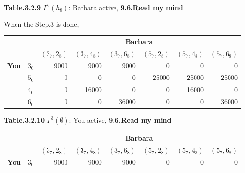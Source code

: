 \documentclass{article}
\begin{document}
\begin{description}
\begin{center}
         {\bf Table.3.2.9 }$\Gamma ^2(h_8)$: Barbara active, {\bf 9.6.Read my mind}
    \end{center}
    When the Step.3 is done,
    \begin{center}
        \begin{tabular}{rrrrrrrr}
        \hline
        \hline
                   &            &                                          \multicolumn{ 6}{c}{{\bf Barbara}} \\

                   &            &  $(3_7,2_8)$ &  $(3_7,4_8)$ &  $(3_7,6_8)$ &  $(5_7,2_8)$ &  $(5_7,4_8)$ &  $(5_7,6_8)$ \\
        \hline
        \multicolumn{ 1}{c}{{\bf You}} &        $3_0$ &       9000 &       9000 &       9000 &          0 &          0 &          0 \\

        \multicolumn{ 1}{c}{{\bf }} &        $5_0$ &          0 &          0 &          0 &      25000 &      25000 &      25000 \\

        \multicolumn{ 1}{c}{{\bf }} &        $4_0$ &          0 &      16000 &          0 &          0 &      16000 &          0 \\

        \multicolumn{ 1}{c}{{\bf }} &        $6_0$ &          0 &          0 &      36000 &          0 &          0 &      36000 \\
        \hline
        \hline
        \end{tabular}

        {\bf Table.3.2.10 }$\Gamma ^3(\emptyset )$: You active, {\bf 9.6.Read my mind}
    \end{center}

    \begin{center}
        \begin{tabular}{rrrrrrrr}
        \hline
        \hline
                   &            &                                          \multicolumn{ 6}{c}{{\bf Barbara}} \\

                   &            &  $(3_7,2_8)$ &  $(3_7,4_8)$ &  $(3_7,6_8)$ &  $(5_7,2_8)$ &  $(5_7,4_8)$ &  $(5_7,6_8)$ \\
        \hline
        \multicolumn{ 1}{c}{{\bf You}} &        $3_0$ &       9000 &       9000 &       9000 &          0 &          0 &          0 \\


\end{tabular}
\end{center}
\end{description}
\end{document}
